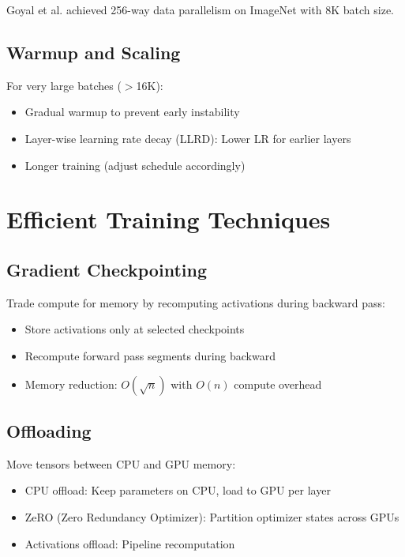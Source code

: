 Goyal et al. \cite{goyal2017accurate} achieved 256-way data parallelism on ImageNet with 8K batch size.

\subsection{Warmup and Scaling}

For very large batches ($>$16K):
\begin{itemize}
    \item Gradual warmup to prevent early instability
    \item Layer-wise learning rate decay (LLRD): Lower LR for earlier layers
    \item Longer training (adjust schedule accordingly)
\end{itemize}

\section{Efficient Training Techniques}

\subsection{Gradient Checkpointing}

Trade compute for memory by recomputing activations during backward pass:
\begin{itemize}
    \item Store activations only at selected checkpoints
    \item Recompute forward pass segments during backward
    \item Memory reduction: $O(\sqrt{n})$ with $O(n)$ compute overhead
\end{itemize}

\subsection{Offloading}

Move tensors between CPU and GPU memory:
\begin{itemize}
    \item CPU offload: Keep parameters on CPU, load to GPU per layer
    \item ZeRO (Zero Redundancy Optimizer): Partition optimizer states across GPUs
    \item Activations offload: Pipeline recomputation
\end{itemize}

